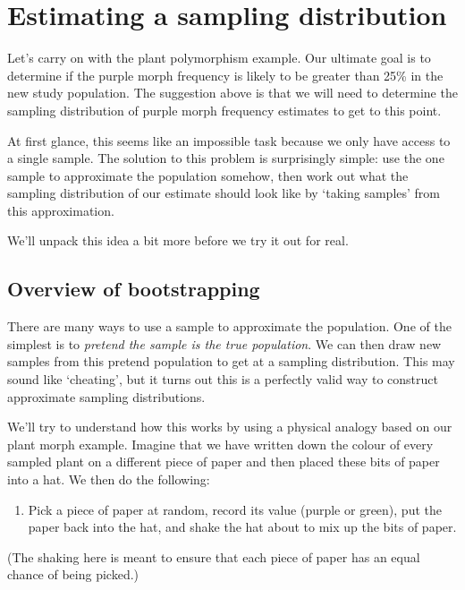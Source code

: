 \documentclass[
]{book}
\providecommand{\tightlist}{%
  \setlength{\itemsep}{0pt}\setlength{\parskip}{0pt}}
\begin{document}
\hypertarget{bootstrap}{%
\section{Estimating a sampling distribution}\label{bootstrap}}

Let's carry on with the plant polymorphism example. Our ultimate goal is to determine if the purple morph frequency is likely to be greater than 25\% in the new study population. The suggestion above is that we will need to determine the sampling distribution of purple morph frequency estimates to get to this point.

At first glance, this seems like an impossible task because we only have access to a single sample. The solution to this problem is surprisingly simple: use the one sample to approximate the population somehow, then work out what the sampling distribution of our estimate should look like by `taking samples' from this approximation.

We'll unpack this idea a bit more before we try it out for real.

\hypertarget{bootstrap-overview}{%
\subsection{Overview of bootstrapping}\label{bootstrap-overview}}

There are many ways to use a sample to approximate the population. One of the simplest is to \emph{pretend the sample is the true population}. We can then draw new samples from this pretend population to get at a sampling distribution. This may sound like `cheating', but it turns out this is a perfectly valid way to construct approximate sampling distributions.

We'll try to understand how this works by using a physical analogy based on our plant morph example. Imagine that we have written down the colour of every sampled plant on a different piece of paper and then placed these bits of paper into a hat. We then do the following:

\begin{enumerate}
\def\labelenumi{\arabic{enumi}.}
\tightlist
\item
  Pick a piece of paper at random, record its value (purple or green), put the paper back into the hat, and shake the hat about to mix up the bits of paper.
\end{enumerate}

(The shaking here is meant to ensure that each piece of paper has an equal chance of being picked.)
\end{document}
